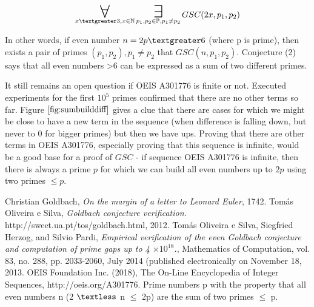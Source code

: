 \documentclass[10pt,twocolumn]{article}
\newcommand\bigforall{\mbox{\huge $\mathsurround0pt\forall$}}
\newcommand\bigexists{\mbox{\huge $\mathsurround0pt\exists$}}
\begin{document}
\begin{equation}
\displaystyle\mathop{\bigforall}_{x \textgreater 3, x \in \mathbb{N}} \displaystyle\mathop{\bigexists}_{p_1, p_2 \in \mathbb{P}, p_1 \neq p_2 } GSC (2x, p_1, p_2)
\end{equation}

In other words, if even number $n = 2p \textgreater 6$ (where p is prime), then exists a pair of primes $(p_1, p_2), p_1 \neq p_2$ that $GSC (n, p_1, p_2)$. Conjecture (2) says that all even numbers \textgreater 6 can be expressed as a sum of two different primes. \par
It still remains an open question if OEIS A301776 is finite or not. Executed experiments for the first $10^5$ primes confirmed that there are no other terms so far. Figure $\ref{fig:sumbuilddiff}$ gives a clue that there are cases for which we might be close to have a new term in the sequence (when difference is falling down, but never to $0$ for bigger primes) but then we have ups. Proving that there are other terms in OEIS A301776, especially proving that this sequence is infinite, would be a good base for a proof of $GSC$ - if sequence OEIS A301776 is infinite, then there is always a prime $p$ for which we can build all even numbers up to $2p$ using two primes $\leq p$.

\begin{thebibliography}{9}
  Christian Goldbach, 
  \emph{On the margin of a letter to Leonard Euler},
  1742.
  Tomás Oliveira e Silva,
  \emph{Goldbach conjecture verification.}
  http://sweet.ua.pt/tos/goldbach.html,
  2012.
  Tomás Oliveira e Silva, Siegfried Herzog, and Silvio Pardi, 
  \emph{Empirical verification of the even Goldbach conjecture and computation of prime gaps up to 4 $\times 10^{18}$.}, 
  Mathematics of Computation, vol. 83, no. 288, pp. 2033-2060, 
  July 2014 (published electronically on November 18, 2013.
  OEIS Foundation Inc. (2018), The On-Line Encyclopedia of Integer Sequences, http://oeis.org/A301776. Prime numbers p with the property that all even numbers n (2 $\textless$ n $\leq$ 2p) are the sum of two primes $\leq$ p.
  
\end{thebibliography}
\end{document}
